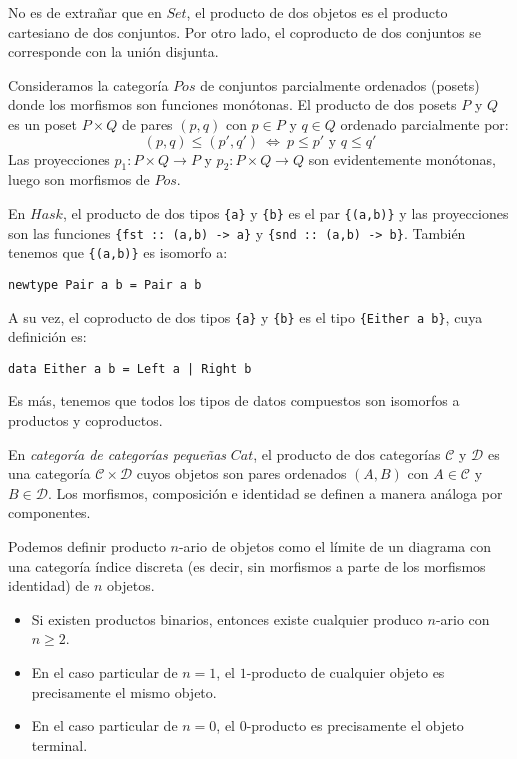 \documentclass[12pt, twoside]{book}
\newcommand{\code}[1]{\Verb+{#1}+}
\newcommand{\cat}{{\mathcal{C}}}
\newcommand{\Set}{{Set}}
\newcommand{\Cat}{{Cat}}
\newcommand{\Hask}{{Hask}}
\newcommand{\sii}{{\ \Leftrightarrow\ }}
\begin{document}
\begin{example}
No es de extrañar que en $\Set$, el producto de dos objetos es el producto cartesiano de dos conjuntos.
Por otro lado, el coproducto de dos conjuntos se corresponde con la unión disjunta.
\end{example}

\begin{example}\label{ejemplo-producto-pos}
Consideramos la categoría $Pos$ de conjuntos parcialmente ordenados (posets) donde los morfismos son funciones monótonas.
El producto de dos posets $P$ y $Q$ es un poset $P \times Q$ de pares $(p,q)$ con $p \in P$ y $q \in Q$ ordenado parcialmente por:
\[ (p,q) \leq (p',q') \sii p \leq p' \text{ y }q \leq q' \]
Las proyecciones $p_1 \colon P \times Q \to P$ y $p_2 \colon P \times Q \to Q$ son evidentemente monótonas, luego son morfismos de $Pos$.
\end{example}

\begin{example}
En $\Hask$, el producto de dos tipos \code{a} y \code{b} es el par \code{(a,b)} y las proyecciones son las funciones \code{fst :: (a,b) -> a} y \code{snd :: (a,b) -> b}.
También tenemos que \code{(a,b)} es isomorfo a:
\begin{verbatim}
newtype Pair a b = Pair a b
\end{verbatim}
A su vez, el coproducto de dos tipos \code{a} y \code{b} es el tipo \code{Either a b}, cuya definición es:
\begin{verbatim}
data Either a b = Left a | Right b
\end{verbatim}
Es más, tenemos que todos los tipos de datos compuestos son isomorfos a productos y coproductos.
\end{example}

\begin{example}
En \emph{categoría de categorías pequeñas} $\Cat$, el producto de dos categorías $\cat$ y $\mathcal{D}$ es una categoría $\cat \times \mathcal{D}$ cuyos objetos son pares ordenados $(A,B)$ con $A \in \cat$ y $B \in \mathcal{D}$.
Los morfismos, composición e identidad se definen a manera análoga por componentes.
\end{example}

Podemos definir producto $n$-ario de objetos como el límite de un diagrama con una categoría índice discreta (es decir, sin morfismos a parte de los morfismos identidad) de $n$ objetos.
\begin{remark}\mbox{}
\begin{itemize}
  \item Si existen productos binarios, entonces existe cualquier produco $n$-ario con $n \geq 2$.
  \item En el caso particular de $n=1$, el $1$-producto de cualquier objeto es precisamente el mismo objeto.
  \item En el caso particular de $n=0$, el $0$-producto es precisamente el objeto terminal.
\end{itemize}
\end{remark}
\end{document}
